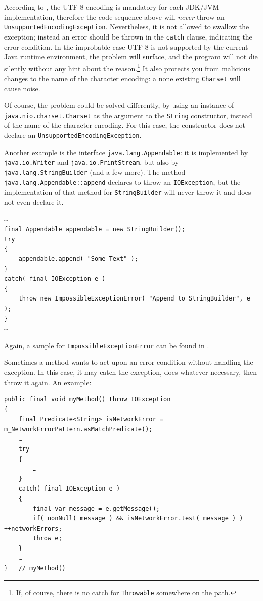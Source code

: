 \documentclass[11pt,a4paper, titlepage, parskip=half, headsepline, footsepline, cleardoublepage=current, headheight=1cm]{scrbook}
\begin{document}
According to \autocite{ORACLE_DOC_CHARSET:StandardCharsets}, the UTF-8 encoding is mandatory for each JDK/JVM implementation, therefore the code sequence above will \textit{never} throw an \lstinline|UnsupportedEncodingException|. Nevertheless, it is not allowed to swallow the exception; instead an error should be thrown in the \lstinline|catch| clause, indicating the error condition. In the improbable case UTF-8 is not supported by the current Java runtime environment, the problem will surface, and the program will not die silently without any hint about the reason.\footnote{If, of course, there is no catch for \lstinline|Throwable| somewhere on the path.} It also protects you from malicious changes to the name of the character encoding: a none existing \lstinline|Charset| will cause noise.

Of course, the problem could be solved differently, by using an instance of \lstinline|java.nio.charset.Charset|\autocite{ORACLE_DOC_CHARSET_CLASS} as the argument to the \lstinline|String| constructor, instead of the name of the character encoding. For this case, the constructor does not declare an \lstinline|UnsupportedEncodingException|. 

Another example is the interface \lstinline|java.lang.Appendable|\autocite{ORACLE_DOC_APPENDABLE_INTERFACE}: it is implemented by \lstinline|java.io.Writer| and \lstinline|java.io.PrintStream|, but also by \lstinline|java.lang.StringBuilder| (and a few more). The method \lstinline|java.lang.Appendable::append| declares to throw an \lstinline|IOException|, but the implementation of that method for \lstinline|StringBuilder| will never throw it and does not even declare it.
\begin{lstlisting}
…
final Appendable appendable = new StringBuilder();
try
{
    appendable.append( "Some Text" );
}
catch( final IOException e )
{
    throw new ImpossibleExceptionError( "Append to StringBuilder", e );
}
…
\end{lstlisting}

Again, a sample for \lstinline|ImpossibleExceptionError| can be found in \autocite{TQUADRAT_ORG_FOUNDATION_IMPOSSIBLEEXCEPTIONERROR}.

Sometimes a method wants to act upon an error condition without handling the exception. In this case, it may catch the exception, does whatever necessary, then throw it again. An example:
\begin{lstlisting}
public final void myMethod() throw IOException
{
    final Predicate<String> isNetworkError = m_NetworkErrorPattern.asMatchPredicate();
    …
    try
    {
        …
    }
    catch( final IOException e )
    {
        final var message = e.getMessage();
        if( nonNull( message ) && isNetworkError.test( message ) ) ++networkErrors;
        throw e;
    }
    …
}   // myMethod()
\end{lstlisting}
\end{document}
